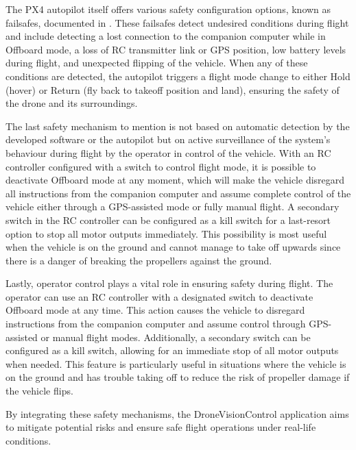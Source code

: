 The PX4 autopilot itself offers various safety configuration options, known as failsafes, documented in  \cite{px4-docs-safety}. These failsafes detect undesired conditions during flight and include detecting a lost connection to the companion computer while in Offboard mode, a loss of RC transmitter link or GPS position, low battery levels during flight, and unexpected flipping of the vehicle. When any of these conditions are detected, the autopilot triggers a flight mode change to either Hold (hover) or Return (fly back to takeoff position and land), ensuring the safety of the drone and its surroundings.

The last safety mechanism to mention is not based on automatic detection by the developed software or the autopilot but on active surveillance of the system's behaviour during flight by the operator in control of the vehicle.
With an RC controller configured with a switch to control flight mode, it is possible to deactivate Offboard mode at any moment, which will make the vehicle disregard all instructions from the companion computer and assume complete control of the vehicle either through a GPS-assisted mode or fully manual flight.
A secondary switch in the RC controller can be configured as a kill switch for a last-resort option to stop all motor outputs immediately.
This possibility is most useful when the vehicle is on the ground and cannot manage to take off upwards since there is a danger of breaking the propellers against the ground.

Lastly, operator control plays a vital role in ensuring safety during flight. The operator can use an RC controller with a designated switch to deactivate Offboard mode at any time. This action causes the vehicle to disregard instructions from the companion computer and assume control through GPS-assisted or manual flight modes. Additionally, a secondary switch can be configured as a kill switch, allowing for an immediate stop of all motor outputs when needed. This feature is particularly useful in situations where the vehicle is on the ground and has trouble taking off to reduce the risk of propeller damage if the vehicle flips.

By integrating these safety mechanisms, the DroneVisionControl application aims to mitigate potential risks and ensure safe flight operations under real-life conditions.
